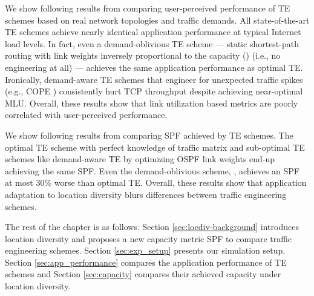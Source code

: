 We show following results from comparing user-perceived performance of TE schemes based on real network topologies and traffic demands. All state-of-the-art TE schemes achieve nearly identical application performance at typical Internet load levels. In fact, even a demand-oblivious TE scheme --- static shortest-path routing with link weights inversely proportional to the capacity (\invcap) (i.e., no engineering at all) --- achieves the same application performance as optimal TE. Ironically, demand-aware TE schemes that engineer for unexpected traffic spikes (e.g., COPE \cite{COPE}) consistently hurt TCP throughput despite achieving near-optimal MLU. Overall, these results show that link utilization based metrics are poorly correlated with user-perceived performance.

We show following results from comparing SPF achieved by TE schemes. The optimal TE scheme with perfect knowledge of traffic matrix and sub-optimal TE schemes like demand-aware TE by optimizing OSPF link weights \cite{fortz2000internet} end-up achieving the same SPF. Even the demand-oblivious scheme, \invcap, achieves an SPF at most 30\% worse than optimal TE. Overall, these results show that application adaptation to location diversity blurs differences between traffic engineering schemes.

The rest of the chapter is as follows. Section \ref{sec:locdiv-background} introduces location diversity and proposes a new capacity metric SPF to compare traffic engineering schemes. Section \ref{sec:exp_setup} presents our simulation setup. Section \ref{sec:app_performance} compares the application performance of TE schemes and Section \ref{sec:capacity} compares their achieved capacity under location diversity. 



